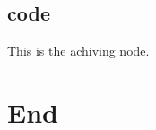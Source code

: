 \documentclass[a4paper]{article}
\begin{document}
\subsection{code}
\label{sec-11-2}

This is the achiving node.
\section{End}
\label{sec-12}

\end{document}
